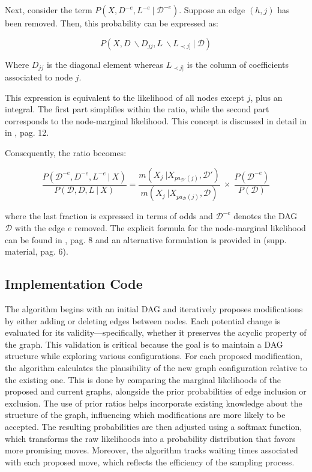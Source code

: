 \documentclass{report}
\begin{document}
Next, consider the term $P(X ,D^{-e},L^{-e} \ | \ \mathcal{D}^{-e})$. Suppose an edge $(h,j)$  has been removed. Then, this probability can be expressed as:

$$
P(X,D \  \backslash D_{jj}, L\ \backslash L_{\prec j ]} \ | \ \mathcal{D} )
$$

Where $D_{jj}$ is the diagonal element whereas $L_{\prec j ]}$ is the column of coefficients associated to node $j$. 

This expression is equivalent to the likelihood of all nodes except $j$, plus an integral. The first part simplifies within the ratio, while the second part corresponds to the node-marginal likelihood. This concept is discussed in detail in in \citet{castelletti2022bcdag}, pag. 12.

Consequently, the ratio becomes:

$$
\frac{P(\mathcal{D}^{-e},D^{-e},L^{-e} \ | \ X)}{P(\mathcal{D},D,L \ | \ X)} = \frac{m(X_j \ | X_{pa_{\mathcal{D}'}(j)},\mathcal{D}')}{m(X_j \ | X_{pa_{\mathcal{D}}(j)},\mathcal{D})}\ \times \ \frac{P(\mathcal{D}^{-e})}{P(\mathcal{D})}
$$

where the last fraction is expressed in terms of odds and $\mathcal{D}^{-e}$ denotes the DAG $\mathcal{D}$ with the edge $e$ removed. The explicit formula for the node-marginal likelihood can be found in \citet{castelletti2022bcdag}, pag. 8 and an alternative formulation is provided in \citet{castelletti2021bayesian} (supp. material, pag. 6).

\subsection{Implementation Code}

The algorithm  begins with an initial DAG and iteratively proposes modifications by either adding or deleting edges between nodes. Each potential change is evaluated for its validity—specifically, whether it preserves the acyclic property of the graph. This validation is critical because the goal is to maintain a DAG structure while exploring various configurations.
For each proposed modification, the algorithm calculates the plausibility of the new graph configuration relative to the existing one. This is done by comparing the marginal likelihoods of the proposed and current graphs, alongside the prior probabilities of edge inclusion or exclusion. The use of prior ratios helps incorporate existing knowledge about the structure of the graph, influencing which modifications are more likely to be accepted. The resulting probabilities are then adjusted using a softmax function, which transforms the raw likelihoods into a probability distribution that favors more promising moves.
Moreover, the algorithm tracks waiting times associated with each proposed move, which reflects the efficiency of the sampling process. 
\end{document}
